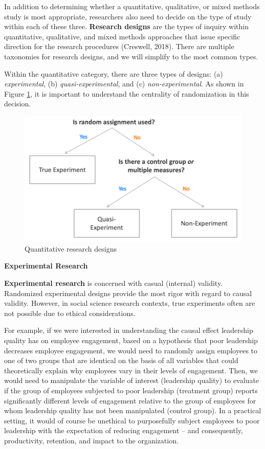 \documentclass[
]{book}
\begin{document}
In addition to determining whether a quantitative, qualitative, or mixed methods study is most appropriate, researchers also need to decide on the type of study within each of these three. \textbf{Research designs} are the types of inquiry within quantitative, qualitative, and mixed methods approaches that issue specific direction for the research procedures (Creswell, 2018). There are multiple taxonomies for research designs, and we will simplify to the most common types.

Within the quantitative category, there are three types of designs: (a) \emph{experimental}, (b) \emph{quasi-experimental}, and (c) \emph{non-experimental}. As shown in Figure \ref{fig:res-designs}, it is important to understand the centrality of randomization in this decision.

\begin{figure}

{\centering \includegraphics[width=0.75\linewidth]{graphics/research_designs} 

}

\caption{Quantitative research designs}\label{fig:res-designs}
\end{figure}

\textbf{Experimental Research}

\textbf{Experimental research} is concerned with casual (internal) validity. Randomized experimental designs provide the most rigor with regard to causal validity. However, in social science research contexts, true experiments often are not possible due to ethical considerations.

For example, if we were interested in understanding the causal effect leadership quality has on employee engagement, based on a hypothesis that poor leadership decreases employee engagement, we would need to randomly assign employees to one of two groups that are identical on the basis of all variables that could theoretically explain why employees vary in their levels of engagement. Then, we would need to manipulate the variable of interest (leadership quality) to evaluate if the group of employees subjected to poor leadership (treatment group) reports significantly different levels of engagement relative to the group of employees for whom leadership quality has not been manipulated (control group). In a practical setting, it would of course be unethical to purposefully subject employees to poor leadership with the expectation of reducing engagement -- and consequently, productivity, retention, and impact to the organization.
\end{document}

